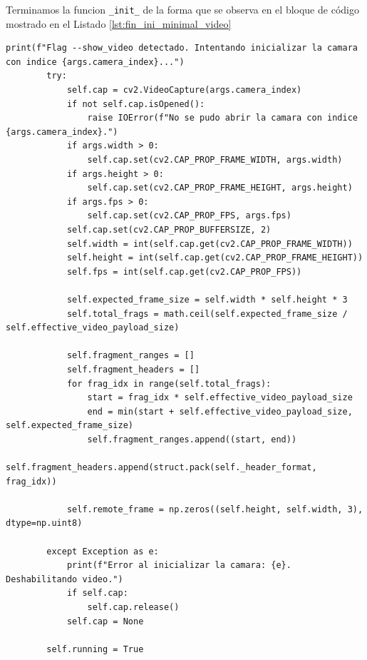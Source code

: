 Terminamos la funcion \texttt{\_init\_} de la forma que se observa en el bloque de código mostrado en el Listado \ref{lst:fin_ini_minimal_video}
\vspace{\baselineskip}
\begin{lstlisting}[style=pythonstyle, caption={Fin de la inicialización de \textit{Minimal\_Video}.}, label={lst:fin_ini_minimal_video}]
print(f"Flag --show_video detectado. Intentando inicializar la camara con indice {args.camera_index}...")
        try:
            self.cap = cv2.VideoCapture(args.camera_index)
            if not self.cap.isOpened():
                raise IOError(f"No se pudo abrir la camara con indice {args.camera_index}.")
            if args.width > 0:
                self.cap.set(cv2.CAP_PROP_FRAME_WIDTH, args.width)
            if args.height > 0:
                self.cap.set(cv2.CAP_PROP_FRAME_HEIGHT, args.height)
            if args.fps > 0:
                self.cap.set(cv2.CAP_PROP_FPS, args.fps)
            self.cap.set(cv2.CAP_PROP_BUFFERSIZE, 2)
            self.width = int(self.cap.get(cv2.CAP_PROP_FRAME_WIDTH))
            self.height = int(self.cap.get(cv2.CAP_PROP_FRAME_HEIGHT))
            self.fps = int(self.cap.get(cv2.CAP_PROP_FPS))

            self.expected_frame_size = self.width * self.height * 3
            self.total_frags = math.ceil(self.expected_frame_size / self.effective_video_payload_size)

            self.fragment_ranges = []
            self.fragment_headers = []
            for frag_idx in range(self.total_frags):
                start = frag_idx * self.effective_video_payload_size
                end = min(start + self.effective_video_payload_size, self.expected_frame_size)
                self.fragment_ranges.append((start, end))
                self.fragment_headers.append(struct.pack(self._header_format, frag_idx))

            self.remote_frame = np.zeros((self.height, self.width, 3), dtype=np.uint8)
            
        except Exception as e:
            print(f"Error al inicializar la camara: {e}. Deshabilitando video.")
            if self.cap:
                self.cap.release()
            self.cap = None

        self.running = True
\end{lstlisting}


